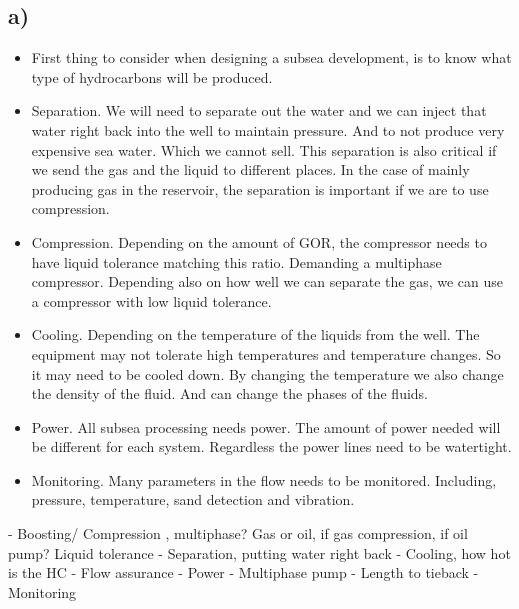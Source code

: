 \documentclass[DIV=calc, paper=a4, fontsize=13pt, twocolumn]{scrartcl}	 %
\begin{document}
\subsection*{a)}
\begin{itemize}
\item First thing to consider when designing a subsea development, is to know what type of hydrocarbons will be produced. 
\item Separation.  We will need to separate out the water and we can inject that water right back into the well to maintain pressure. And to not produce very expensive sea water. Which we cannot sell. This separation is also critical if we send the gas and the liquid to different places. In the case of mainly producing gas in the reservoir, the separation is important if we are to use compression.
\item Compression. Depending on the amount of GOR, the compressor needs to have liquid tolerance matching this ratio. Demanding a multiphase compressor. Depending also on how well we can separate the gas, we can use a compressor with low liquid tolerance. 
\item Cooling. Depending on the temperature of the liquids from the well. The equipment may not tolerate high temperatures and temperature changes. So it may need to be cooled down. By changing the temperature we also change the density of the fluid. And can change the phases of the fluids.
\item Power. All subsea processing needs power. The amount of power needed will be different for each system. Regardless the power lines need to be watertight. 
\item Monitoring. Many parameters in the flow needs to be monitored. Including, pressure, temperature, sand detection and vibration.
\end{itemize}
- Boosting/ Compression , multiphase? Gas or oil, if gas compression, if oil pump? Liquid tolerance
- Separation, putting water right back
- Cooling, how hot is the HC
- Flow assurance
- Power
- Multiphase pump
- Length to tieback
- Monitoring
\end{document}

